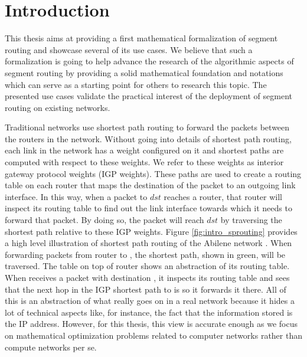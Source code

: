 \chapter{Introduction}
\label{chapter:into}

This thesis aims at providing a first mathematical formalization of segment routing and 
showcase several of its use cases. We believe that such a formalization is
going to help advance the research of the algorithmic aspects of segment routing by
providing a solid mathematical foundation and notations which can serve as a starting
point for others to research this topic.
The presented use cases validate the practical interest of the deployment of segment routing
on existing networks.

Traditional networks use shortest path routing to forward the packets between the routers
in the network. Without going into details of shortest path routing, each link in the network 
has a weight configured on it and shortest paths are computed with respect to these weights. We refer to these weights
as interior gateway protocol weights (IGP weights). These paths are
used to create a routing table on each router that maps the destination of the packet to an outgoing link interface.
In this way, when a packet to $dst$ reaches a router, that router will inspect its routing table to find out
the link interface towards which it needs to forward that packet. By doing so, the packet will reach $dst$ by traversing the
shortest path relative to these IGP weights. 
Figure \ref{fig:intro_sprouting} provides a high level illustration of shortest path routing of the Abilene network \cite{abilene}.
When forwarding packets from router  to , the shortest path, shown in green, will be traversed.
The table on top of router  shows an abstraction of its routing
table. When  receives a packet with destination , it inspects its routing table and sees that
the next hop in the IGP shortest path to  is  so it forwards it there.
All of this is an abstraction of what really goes on in a real network because it hides a lot of technical 
aspects like, for instance, the fact that the information stored is the IP address. However, for this thesis, this view is accurate enough as we focus on mathematical optimization problems related to
computer networks rather than compute networks per se.

